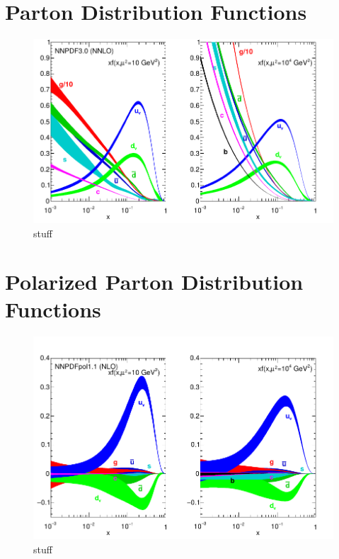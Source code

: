\section{Parton Distribution Functions}

\begin{figure}[ht]
  \centering
  \includegraphics[width=0.7\linewidth]{./figures/unpolarized_pdfs.pdf}
  \caption{
    stuff~\cite{ReviewEidelman2012}
  } 
  \label{fig:unpolarized_pdf}
\end{figure}

\section{Polarized Parton Distribution Functions}
\label{sec:polarized_pdfs}

\begin{figure}
  \centering
  \includegraphics[width=0.7\linewidth]{./figures/polarized_pdfs.pdf}
  \caption{
    stuff~\cite{ReviewEidelman2012}
  }
  \label{fig:polarized_pdfs}
\end{figure}

